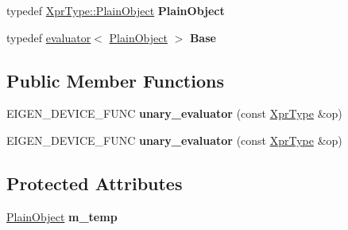 \begin{DoxyCompactItemize}
typedef \hyperlink{group___core___module_aae45af9b5aca5a9caae98fd201f47cc4}{Xpr\+Type\+::\+Plain\+Object} {\bfseries Plain\+Object}
\item 
\mbox{\label{struct_eigen_1_1internal_1_1unary__evaluator_3_01_homogeneous_3_01_arg_type_00_01_direction_01_4_00_01_index_based_01_4_a008cab07c8fa1c15d77baff726dd0a82}} 
typedef \hyperlink{struct_eigen_1_1internal_1_1evaluator}{evaluator}$<$ \hyperlink{class_eigen_1_1internal_1_1_tensor_lazy_evaluator_writable}{Plain\+Object} $>$ {\bfseries Base}
\end{DoxyCompactItemize}
\subsection*{Public Member Functions}
\begin{DoxyCompactItemize}
\item 
\mbox{\label{struct_eigen_1_1internal_1_1unary__evaluator_3_01_homogeneous_3_01_arg_type_00_01_direction_01_4_00_01_index_based_01_4_a2dc020a67e6c1dfc3e3566e02587ab45}} 
E\+I\+G\+E\+N\+\_\+\+D\+E\+V\+I\+C\+E\+\_\+\+F\+U\+NC {\bfseries unary\+\_\+evaluator} (const \hyperlink{group___geometry___module_class_eigen_1_1_homogeneous}{Xpr\+Type} \&op)
\item 
\mbox{\label{struct_eigen_1_1internal_1_1unary__evaluator_3_01_homogeneous_3_01_arg_type_00_01_direction_01_4_00_01_index_based_01_4_a2dc020a67e6c1dfc3e3566e02587ab45}} 
E\+I\+G\+E\+N\+\_\+\+D\+E\+V\+I\+C\+E\+\_\+\+F\+U\+NC {\bfseries unary\+\_\+evaluator} (const \hyperlink{group___geometry___module_class_eigen_1_1_homogeneous}{Xpr\+Type} \&op)
\end{DoxyCompactItemize}
\subsection*{Protected Attributes}
\begin{DoxyCompactItemize}
\item 
\mbox{\label{struct_eigen_1_1internal_1_1unary__evaluator_3_01_homogeneous_3_01_arg_type_00_01_direction_01_4_00_01_index_based_01_4_ad539b27f1aad1bb5b11ffe06daad1a8f}} 
\hyperlink{class_eigen_1_1internal_1_1_tensor_lazy_evaluator_writable}{Plain\+Object} {\bfseries m\+\_\+temp}
\end{DoxyCompactItemize}


